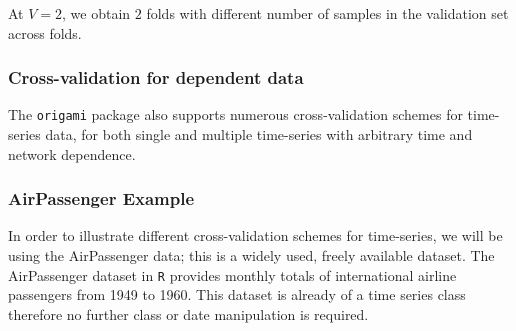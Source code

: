 \documentclass[12pt, krantz2,]{krantz}
\newenvironment{Shaded}{\begin{snugshade}}{\end{snugshade}}
\newcommand{\CommentTok}[1]{\textcolor[rgb]{0.37,0.37,0.37}{\textit{#1}}}
\newcommand{\DataTypeTok}[1]{\textcolor[rgb]{0.27,0.27,0.27}{#1}}
\newcommand{\DecValTok}[1]{\textcolor[rgb]{0.06,0.06,0.06}{#1}}
\newcommand{\KeywordTok}[1]{\textcolor[rgb]{0.27,0.27,0.27}{\textbf{#1}}}
\newcommand{\NormalTok}[1]{#1}
\newcommand{\StringTok}[1]{\textcolor[rgb]{0.5,0.5,0.5}{#1}}
\theoremstyle{definition}
\theoremstyle{definition}
\theoremstyle{definition}
\newcommand{\1}{\mathbbm{1}}
\begin{document}
At \(V=2\), we obtain \(2\) folds with different number of samples in the validation
set across folds.

\begin{Shaded}
\end{Shaded}

\hypertarget{cross-validation-for-dependent-data}{%
\subsubsection{Cross-validation for dependent data}\label{cross-validation-for-dependent-data}}

The \texttt{origami} package also supports numerous cross-validation schemes for
time-series data, for both single and multiple time-series with arbitrary time
and network dependence.

\hypertarget{airpassenger-example}{%
\subsubsection*{AirPassenger Example}\label{airpassenger-example}}


In order to illustrate different cross-validation schemes for time-series, we
will be using the AirPassenger data; this is a widely used, freely available
dataset. The AirPassenger dataset in \texttt{R} provides monthly totals of
international airline passengers from 1949 to 1960. This dataset is already of a
time series class therefore no further class or date manipulation is required.
\end{document}
